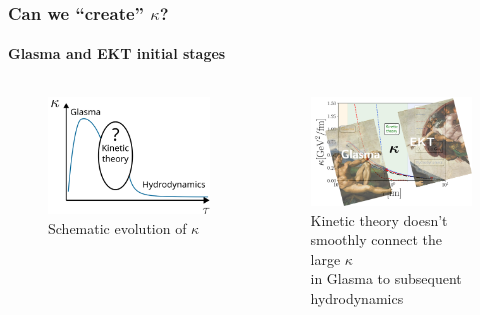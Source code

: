 \documentclass[aspectratio=169,11pt,usenames,dvipsnames]{beamer}
\begin{document}
\begin{frame}[noframenumbering]
    \frametitle{Can we ``create'' $\kappa$?}
    \framesubtitle{Glasma and EKT initial stages}
    \vspace{-0.4cm}
    \begin{columns}[onlytextwidth,t]
        \begin{figure}[!hbt]
            \centering
            \captionsetup{justification=centering}
            \caption{Schematic evolution of $\kappa$}\vspace{-0.3cm}
            \includegraphics[width=0.78\columnwidth]{images/kappa_schematic.png}\vspace{-0.3cm}
        \end{figure}
        \begin{figure}[!hbt]
            \centering
            \captionsetup{justification=centering}
            \caption{{\color{ForestGreen}Kinetic theory} doesn't smoothly connect the large $\kappa$\\ in {\color{Dandelion}Glasma} to subsequent {\color{Periwinkle}hydrodynamics}}\vspace{-0.2cm}
            \includegraphics[width=0.9\columnwidth]{images/kappa_glasma_ekt.png}

\end{figure}
\end{columns}
\end{frame}
\end{document}

